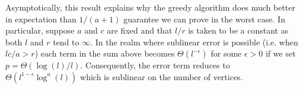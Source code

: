 Asymptotically, this result explains why the greedy
algorithm does much better in expectation than $1/(a+1)$ guarantee we
can prove in the worst case. In particular, suppose $a$ and $c$ are fixed and that
$l/r$ is taken to be a constant as both $l$ and $r$ tend to $\infty$. In the realm where sublinear error is possible (i.e. when $lc/a>r$) each term in the sum above becomes $\Theta(l^{-\epsilon})$ for some $\epsilon>0$ if we set $p=\Theta(\log(l)/l)$. Consequently, the error term reduces to $\Theta(l^{1-\epsilon}\log^a(l))$ which is sublinear on the number of vertices.
